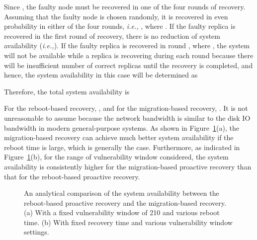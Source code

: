 \documentclass[times, 10pt, twocolumn]{article}
\newcommand{\ie}{{\it i.e.,}}
\begin{document}
Since , the faulty node must be recovered in one of the four rounds
of recovery. Assuming that the faulty node is chosen randomly, it is
recovered in even probability in either of the four rounds, \ie
, where .
If the faulty replica is recovered in the first round of recovery,
there is no reduction of system availability  (\ie ).
If the faulty replica is recovered in round , where ,
the system will not be available while a replica is recovering during
each round because
there will be insufficient number of correct replicas until the recovery
is completed, and hence, the system availability  in this case will
be determined as 

Therefore, the total system availability is 


For the reboot-based recovery, , and
for the migration-based recovery, . It is not
unreasonable to assume  because the network
bandwidth is similar to the disk IO bandwidth in modern general-purpose
systems. As shown in Figure~\ref{avaifig}(a), the migration-based recovery can 
achieve much better system availability if the reboot time  is 
large, which is generally the case. Furthermore, as indicated in 
Figure~\ref{avaifig}(b), for the range of vulnerability window considered,
the system availability is consistently higher for the migration-based 
proactive recovery than that for the reboot-based proactive recovery.

\begin{figure}[t]
\begin{center} 
\leavevmode
\epsfxsize=3.0in
\caption{An analytical comparison of the system availability between the 
reboot-based proactive recovery and the migration-based recovery. 
(a) With a fixed vulnerability window of 210 and various reboot time. 
(b) With fixed recovery time and various vulnerability window settings.}
\label{avaifig}
\end{center}
\end{figure}

\begin{figure*}[t]
\begin{center} 
\leavevmode
\epsfxsize=6.0in
\caption{(a) Service migration latency for different state sizes measured
when (1) the replicas are idle (other than the service migration activity),
labeled as ``Without Client'' and (2) in the presence of one client.
(b) The impact of system load on the migration latency.
(c) The impact of proactive migration on system performance (without and with
one crashed replica), as observed by a single client in terms of the number of 
calls made within one vulnerability window (70).}
\label{perfig}
\end{center}
\end{figure*}
\end{document}
